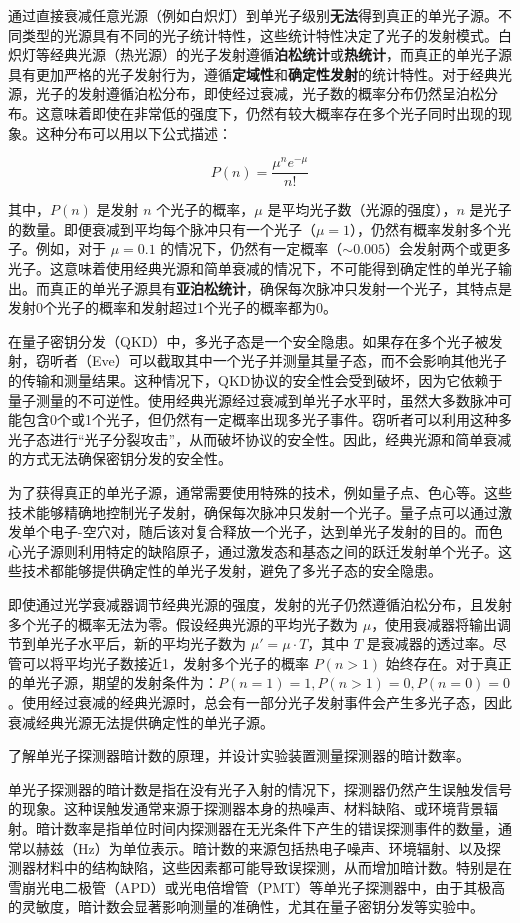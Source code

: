 通过直接衰减任意光源（例如白炽灯）到单光子级别\textbf{无法}得到真正的单光子源。不同类型的光源具有不同的光子统计特性，这些统计特性决定了光子的发射模式。白炽灯等经典光源（热光源）的光子发射遵循\textbf{泊松统计}或\textbf{热统计}，而真正的单光子源具有更加严格的光子发射行为，遵循\textbf{定域性}和\textbf{确定性发射}的统计特性。对于经典光源，光子的发射遵循泊松分布，即使经过衰减，光子数的概率分布仍然呈泊松分布。这意味着即使在非常低的强度下，仍然有较大概率存在多个光子同时出现的现象。这种分布可以用以下公式描述：

\[
P(n) = \frac{\mu^n e^{-\mu}}{n!}
\]

其中，\(P(n)\) 是发射 \(n\) 个光子的概率，\(\mu\) 是平均光子数（光源的强度），\(n\) 是光子的数量。即便衰减到平均每个脉冲只有一个光子（\(\mu = 1\)），仍然有概率发射多个光子。例如，对于 \(\mu = 0.1\) 的情况下，仍然有一定概率（\(\sim 0.005\)）会发射两个或更多光子。这意味着使用经典光源和简单衰减的情况下，不可能得到确定性的单光子输出。而真正的单光子源具有\textbf{亚泊松统计}，确保每次脉冲只发射一个光子，其特点是发射0个光子的概率和发射超过1个光子的概率都为0。

在量子密钥分发（QKD）中，多光子态是一个安全隐患。如果存在多个光子被发射，窃听者（Eve）可以截取其中一个光子并测量其量子态，而不会影响其他光子的传输和测量结果。这种情况下，QKD协议的安全性会受到破坏，因为它依赖于量子测量的不可逆性。使用经典光源经过衰减到单光子水平时，虽然大多数脉冲可能包含0个或1个光子，但仍然有一定概率出现多光子事件。窃听者可以利用这种多光子态进行“光子分裂攻击”，从而破坏协议的安全性。因此，经典光源和简单衰减的方式无法确保密钥分发的安全性。

为了获得真正的单光子源，通常需要使用特殊的技术，例如量子点、色心等。这些技术能够精确地控制光子发射，确保每次脉冲只发射一个光子。量子点可以通过激发单个电子-空穴对，随后该对复合释放一个光子，达到单光子发射的目的。而色心光子源则利用特定的缺陷原子，通过激发态和基态之间的跃迁发射单个光子。这些技术都能够提供确定性的单光子发射，避免了多光子态的安全隐患。

即使通过光学衰减器调节经典光源的强度，发射的光子仍然遵循泊松分布，且发射多个光子的概率无法为零。假设经典光源的平均光子数为 \(\mu\)，使用衰减器将输出调节到单光子水平后，新的平均光子数为 \(\mu' = \mu \cdot T\)，其中 \(T\) 是衰减器的透过率。尽管可以将平均光子数接近1，发射多个光子的概率 \(P(n > 1)\) 始终存在。对于真正的单光子源，期望的发射条件为：\(P(n = 1) = 1, P(n > 1) = 0, P(n = 0) = 0\)。使用经过衰减的经典光源时，总会有一部分光子发射事件会产生多光子态，因此衰减经典光源无法提供确定性的单光子源。

\begin{question}
	了解单光子探测器暗计数的原理，并设计实验装置测量探测器的暗计数率。
\end{question}
单光子探测器的暗计数是指在没有光子入射的情况下，探测器仍然产生误触发信号的现象。这种误触发通常来源于探测器本身的热噪声、材料缺陷、或环境背景辐射。暗计数率是指单位时间内探测器在无光条件下产生的错误探测事件的数量，通常以赫兹（Hz）为单位表示。暗计数的来源包括热电子噪声、环境辐射、以及探测器材料中的结构缺陷，这些因素都可能导致误探测，从而增加暗计数。特别是在雪崩光电二极管（APD）或光电倍增管（PMT）等单光子探测器中，由于其极高的灵敏度，暗计数会显著影响测量的准确性，尤其在量子密钥分发等实验中。

